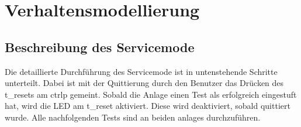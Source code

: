\FloatBarrier
\section{Verhaltensmodellierung}\label{sec:verhaltensmodellierung}

\subsection{Beschreibung des Servicemode}\label{subsec:beschreibung-des-servicemode}
Die detaillierte Durchführung des Servicemode ist in untenstehende Schritte unterteilt.
Dabei ist mit der Quittierung durch den Benutzer das Drücken des \gls{t_reset}s am \gls{ctrlp} gemeint.
Sobald die Anlage einen Test als erfolgreich eingestuft hat, wird die LED am \gls{t_reset} aktiviert.
Diese wird deaktiviert, sobald quittiert wurde.
Alle nachfolgenden Tests sind an beiden \glspl{anlage} durchzuführen.
